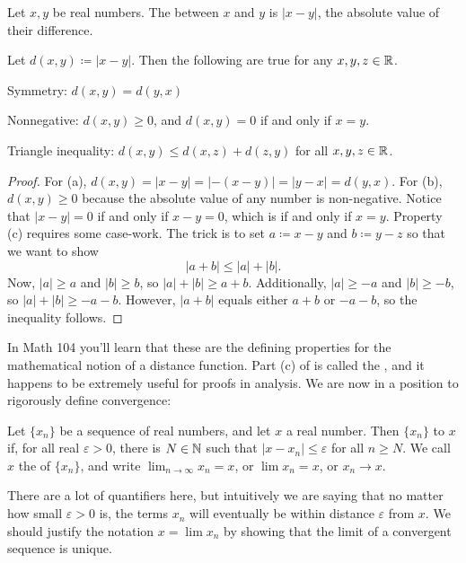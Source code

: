 \documentclass[../notes.tex]{subfiles}
\begin{document}
\begin{definition}[distance]
    Let $x,y$ be real numbers. The  between $x$ and $y$ is $|x-y|$, the absolute value of their difference.
\end{definition}



\begin{proposition}
\label{prop:real-metric}
    Let $d(x,y)\coloneqq|x-y|$. Then the following are true for any $x,y,z\in\mathbb R$.
    \begin{listalph}
        \item Symmetry: $d(x,y)=d(y,x)$
        \item Nonnegative: $d(x,y)\geq 0$, and $d(x,y)=0$ if and only if $x=y$.
        \item Triangle inequality: $d(x,y) \leq d(x,z)+d(z,y)$ for all $x,y,z\in \mathbb R$.
    \end{listalph}
\end{proposition}
\begin{proof}
    For (a), $d(x,y)=|x-y|=|-(x-y)|=|y-x|=d(y,x)$. For (b), $d(x,y)\geq 0$ because the absolute value of any number is non-negative. Notice that $|x-y|=0$ if and only if $x-y=0$, which is if and only if $x=y$. Property (c) requires some case-work. The trick is to set $a\coloneqq x-y$ and $b\coloneqq y-z$ so that we want to show
    \[|a+b|\le|a|+|b|.\]
    Now, $|a|\ge a$ and $|b|\ge b$, so $|a|+|b|\ge a+b$. Additionally, $|a|\ge-a$ and $|b|\ge-b$, so $|a|+|b|\ge-a-b$. However, $|a+b|$ equals either $a+b$ or $-a-b$, so the inequality follows.
\end{proof}

In Math 104 you'll learn that these are the defining properties for the mathematical notion of a distance function. Part (c) of  is called the , and it happens to be extremely useful for proofs in analysis. We are now in a position to rigorously define convergence: 

\begin{definition}
    Let $\{x_n\}$ be a sequence of real numbers, and let $x$ a real number. Then $\{x_n\}$  to $x$ if, for all real $\varepsilon>0$, there is $N\in\mathbb N$ such that $|x-x_n|\leq \varepsilon$ for all $n\geq N$. We call $x$ the  of $\{x_n\}$, and write $\lim_{n\to \infty} x_n =x$, or $\lim x_n =x$, or $x_n\to x$.  
\end{definition}
There are a lot of quantifiers here, but intuitively we are saying that no matter how small $\varepsilon>0$ is, the terms $x_n$ will eventually be within distance $\varepsilon$ from $x$. We should justify the notation $x=\lim x_n$ by showing that the limit of a convergent sequence is unique.
\end{document}
